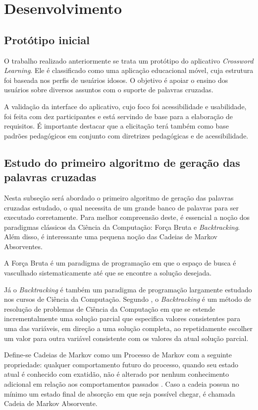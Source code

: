 \section{Desenvolvimento}

\subsection{Protótipo inicial}
O trabalho realizado anteriormente \citep{oliveira2018crossword} se trata um protótipo do aplicativo \textit{Crossword Learning}. Ele é classificado como uma aplicação educacional móvel, cuja estrutura foi baseada nos perfis de usuários idosos. O objetivo é apoiar o ensino dos usuários sobre diversos assuntos com o suporte de palavras cruzadas.

A validação da interface do aplicativo, cujo foco foi acessibilidade e usabilidade, foi feita com dez participantes e está servindo de base para a elaboração de requisitos. É importante destacar que a elicitação terá também como base padrões pedagógicos em conjunto com diretrizes pedagógicas e de acessibilidade.

\subsection{Estudo do primeiro algoritmo de geração das palavras cruzadas} 
Nesta subseção será abordado o primeiro algoritmo de geração das palavras cruzadas estudado, o qual necessita de um grande banco de palavras para ser executado corretamente. Para melhor compreensão deste, é essencial a noção dos paradigmas clássicos da Ciência da Computação: Força Bruta e \textit{Backtracking}. Além disso, é interessante uma pequena noção das Cadeias de Markov Absorventes.

A Força Bruta é um paradigma de programação em que o espaço de busca é vasculhado sistematicamente até que se encontre a solução desejada.

Já o \textit{Backtracking} é também um paradigma de programação largamente estudado nos cursos de Ciência da Computação. Segundo \cite{nilsson1980principles}, o \textit{Backtracking} é um método de resolução de problemas de Ciência da Computação em que se estende incrementalmente uma solução parcial que especifica valores consistentes para uma das variáveis, em direção a uma solução completa, ao repetidamente escolher um valor para outra variável consistente com os valores da atual solução parcial.

Define-se Cadeias de Markov como um Processo de Markov com a seguinte propriedade: qualquer comportamento futuro do processo, quando seu estado atual é conhecido com exatidão, não é alterado por nenhum conhecimento adicional em relação aos comportamentos passados \citep{howard1998introduction}. Caso a cadeia possua no mínimo um estado final de absorção em que seja possível chegar, é chamada Cadeia de Markov Absorvente.

